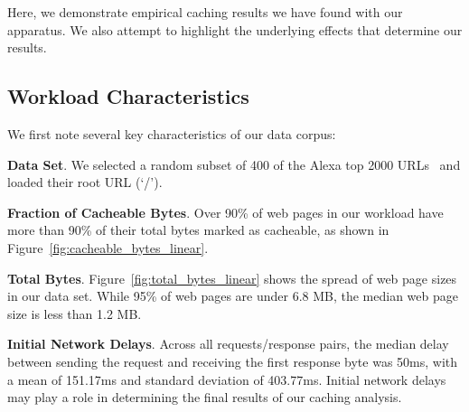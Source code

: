 Here, we demonstrate empirical caching results we have found with our
apparatus. We also attempt to highlight the underlying effects that determine
our results.

\subsection{Workload Characteristics}
We first note several key characteristics of our data corpus:

\textbf{Data Set}. We selected a random subset of 400 of the Alexa top 2000 URLs~\cite{alexa} and loaded their root URL (`/').

\textbf{Fraction of Cacheable Bytes}. Over 90\% of web pages in our workload have more than 90\% of their total bytes marked as cacheable, as shown in Figure~\ref{fig:cacheable_bytes_linear}. %

\textbf{Total Bytes}. Figure~\ref{fig:total_bytes_linear} shows the spread of web page sizes in our data set. While 95\% of web pages are under 6.8 MB, the median web page size is less than 1.2 MB.

\textbf{Initial Network Delays}. Across all requests/response pairs, the median delay between sending the request and receiving the first response byte was 50ms, with a mean of 151.17ms and standard deviation of 403.77ms.
Initial network delays may play a role in determining the final results of our caching analysis. 

